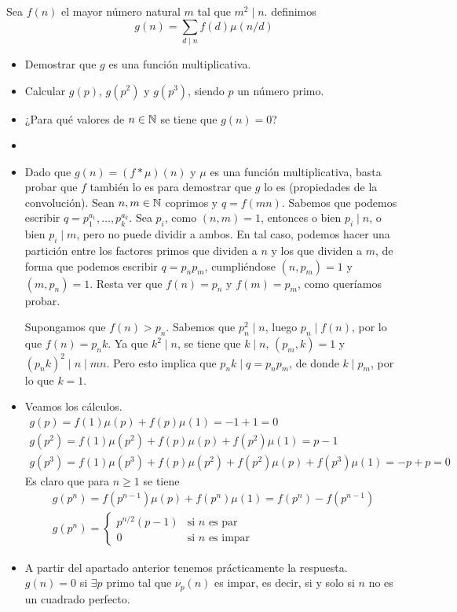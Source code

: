 \documentclass[twoside]{article}
\begin{document}
\begin{ejercicio}{9}
Sea $f(n)$ el mayor número natural $m$ tal que $m^2\mid n$. definimos
\[
g(n) = \sum_{d\mid n} f(d)\mu(n/d)
\]
\begin{itemize}
\item Demostrar que $g$ es una función multiplicativa.
\item Calcular $g(p)$, $g(p^2)$ y $g(p^3)$, siendo $p$ un número primo.
\item ¿Para qué valores de $n\in\mathbb{N}$ se tiene que $g(n)=0$?
\end{itemize}
\begin{sol}
\begin{itemize}
\item[]
\item Dado que $g(n) = (f\ast \mu)(n)$ y $\mu$ es una función multiplicativa, basta probar que $f$ también lo es para demostrar que $g$ lo es (propiedades de la convolución). Sean $n,m\in \mathbb{N}$ coprimos y $q=f(mn)$. Sabemos que podemos escribir $q=p_1^{a_1},\dotsc,p_k^{a_k}$. Sea $p_i$, como $(n,m)=1$, entonces o bien $p_i \mid n$, o bien $p_i \mid m$, pero no puede dividir a ambos. En tal caso, podemos hacer una partición entre los factores primos que dividen a $n$ y los que dividen a $m$, de forma que podemos escribir $q=p_np_m$, cumpliéndose $(n,p_m)=1$ y $(m,p_n)=1$. Resta ver que $f(n)=p_n$ y $f(m)=p_m$, como queríamos probar.

Supongamos que $f(n)>p_n$. Sabemos que $p_n^2\mid n$, luego $p_n \mid f(n)$, por lo que $f(n)=p_n k$. Ya que $k^2 \mid n$, se tiene que $k \mid n$, $(p_m,k)=1$ y $(p_n k)^2 \mid n \mid mn$. Pero esto implica que $p_n k \mid q = p_n p_m$, de donde $k \mid p_m$, por lo que $k=1$.
\item Veamos los cálculos.
\begin{gather*}
g(p)=f(1)\mu(p) + f(p)\mu(1) = -1+1 = 0 \\
g(p^2) = f(1)\mu(p^2) + f(p)\mu(p) + f(p^2)\mu(1) = p-1\\
g(p^3) = f(1)\mu(p^3) + f(p)\mu(p^2) + f(p^2)\mu(p) + f(p^3)\mu(1) = -p+p=0
\end{gather*}
Es claro que para $n\geq 1$ se tiene
\begin{gather*}
g(p^n) = f(p^{n-1})\mu(p) + f(p^n)\mu(1) = f(p^n)-f(p^{n-1})\\
g(p^n) = 
\begin{cases}
p^{n/2}(p-1) & \text{si $n$ es par}\\
0 			& \text{si $n$ es impar}
\end{cases}
\end{gather*}
\item A partir del apartado anterior tenemos prácticamente la respuesta. $g(n)=0$ si $\exists p$ primo tal que $\nu_p(n)$ es impar, es decir, si y solo si $n$ no es un cuadrado perfecto.
\end{itemize}
\end{sol}
\end{ejercicio}
\end{document}

